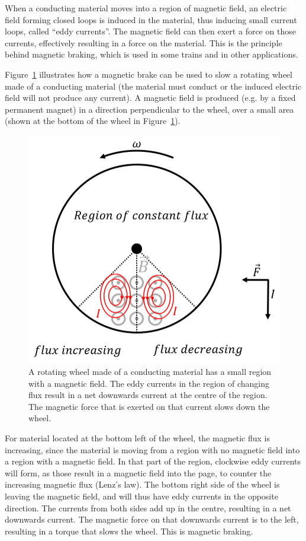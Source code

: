 When a conducting material moves into a region of magnetic field, an electric field forming closed loops is induced in the material, thus inducing small current loops, called ``eddy currents''. The magnetic field can then exert a force on those currents, effectively resulting in a force on the material. This is the principle behind magnetic braking, which is used in some trains and in other applications.

Figure~\ref{fig:induction:magneticbrake} illustrates how a magnetic brake can be used to slow a rotating wheel made of a conducting material (the material must conduct or the induced electric field will not produce any current). A magnetic field is produced (e.g. by a fixed permanent magnet) in a direction perpendicular to the wheel, over a small area (shown at the bottom of the wheel in Figure~\ref{fig:induction:magneticbrake}).

\begin{figure}[!htbp]
\centering
\includegraphics[width=0.6\linewidth]{files/magneticbrake-912a80c2e0d665014177fc2883ff92a1.png}
\caption[]{A rotating wheel made of a conducting material has a small region with a magnetic field. The eddy currents in the region of changing flux result in a net downwards current at the centre of the region. The magnetic force that is exerted on that current slows down the wheel.}
\label{fig:induction:magneticbrake}
\end{figure}

For material located at the bottom left of the wheel, the magnetic flux is increasing, since the material is moving from a region with no magnetic field into a region with a magnetic field. In that part of the region, clockwise eddy currents will form, as those result in a magnetic field into the page, to counter the increasing magnetic flux (Lenz's law). The bottom right side of the wheel is leaving the magnetic field, and will thus have eddy currents in the opposite direction. The currents from both sides add up in the centre, resulting in a net downwards current. The magnetic force on that downwards current is to the left, resulting in a torque that slows the wheel. This is magnetic braking.

